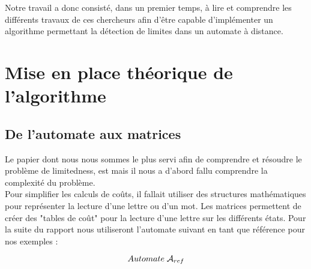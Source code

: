 \documentclass{report}
\begin{document}
Notre travail a donc consisté, dans un premier temps, à lire et comprendre les différents travaux de ces chercheurs afin d'être capable d'implémenter un algorithme permettant la détection de limites dans un automate à distance.

\part{Mise en place théorique de l'algorithme}

\chapter{De l'automate aux matrices}

Le papier dont nous nous sommes le plus servi afin de comprendre et résoudre le problème de limitedness, est \cite{Simon:Semigroups-Matrices-over-Tropical:1994:a} mais il nous a d'abord fallu comprendre la complexité du problème.\\
Pour simplifier les calculs de coûts, il fallait utiliser des structures mathématiques pour représenter la lecture d'une lettre ou d'un mot. Les matrices permettent de créer des "tables de coût" pour la lecture d'une lettre sur les différents états. Pour la suite du rapport nous utiliseront l'automate suivant en tant que référence pour nos exemples :\\

\begin{center}
\[ Automate\; \mathcal{A}_{ref}\]
\end{center}
$\ $
\end{document}
